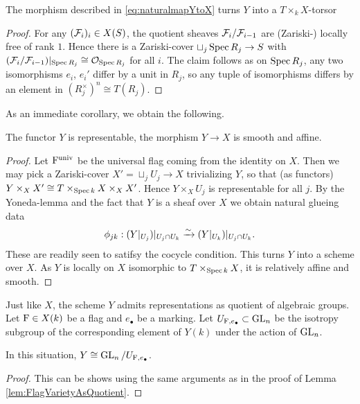 \documentclass[../main.tex]{subfiles}
\begin{document}
\begin{lem}\label{prop:RepresentabilityOfYMarkedFlags}
  The morphism described in \eqref{eq:naturalmapYtoX} turns $Y$ into a
  $T \times_k X$-torsor \begin{proof}
  For any $(\mathcal{F}_i)_i \in X(S)$, the quotient sheaves $\mathcal{F}_i/\mathcal{F}_{i-1}$ are
  (Zariski-) locally free of rank $1$. Hence there is a Zariski-cover $\sqcup_j
  \operatorname{Spec} R_j \to S$
  with $(\mathcal{F}_i/\mathcal{F}_{i-1})|_{\operatorname{Spec} R_j} \cong \mathcal{O}_{\operatorname{Spec} R_j}$ for all $i$. The claim
  follows as on $\operatorname{Spec} R_j$, any two isomorphisms $e_i$, $e_i'$ differ by a
  unit in $R_j$, so any tuple of isomorphisms differs by an element in $(R_j^\times)^n
  \cong T(R_j)$.
\end{proof}
\end{lem}

As an immediate corollary, we obtain the following.
\begin{prop}\label{prop:RepAndPropsOfY}
  The functor $Y$ is representable, the morphism $Y \to X$ is smooth and affine.
\begin{proof}
  Let $\mathrm{F}^{\mathrm{univ}}$ be the universal flag coming from the identity on $X$. Then
  we may pick a Zariski-cover $X' = \sqcup_j U_j \to X$ trivializing $Y$, so
  that (as functors)
  $Y \times_X X' \cong T \times_{\operatorname{Spec} k} X \times_X X'$. Hence $Y \times_X U_j$ is
  representable for all $j$. By the Yoneda-lemma and the fact that $Y$ is a sheaf over 
  $X$ we obtain natural glueing data
  \begin{equation*}
    \phi_{j k}: (Y|_{U_j})|_{U_j \cap U_k} \xrightarrow{\sim} (Y|_{U_k})|_{U_j \cap U_k}.
  \end{equation*}
  These are readily seen to satifsy the cocycle condition. This turns $Y$ into a 
  scheme over $X$. As $Y$ is locally on $X$ isomorphic to $T \times_{\operatorname{Spec} k}
  X$, it is relatively affine and smooth.
\end{proof}
\end{prop}

Just like $X$, the scheme $Y$ admits representations as quotient of algebraic groups.
Let $\mathrm{F} \in X(k)$ be a flag and $e_\bullet$ be a marking. Let 
$U_{\mathrm{F}, e_\bullet} \subset \operatorname{GL}_n$ be the isotropy subgroup of the corresponding
element of $Y(k)$ under the action of $\operatorname{GL}_n$.
\begin{lem}\label{lem:MarkedFlagVarietyAsQuotient}
  In this situation, $Y \cong \operatorname{GL}_n/U_{\mathrm{F}, e_\bullet}$.
\begin{proof}
  This can be shows using the same arguments as in the proof of
  Lemma \ref{lem:FlagVarietyAsQuotient}.
\end{proof}
\end{lem}
\end{document}
